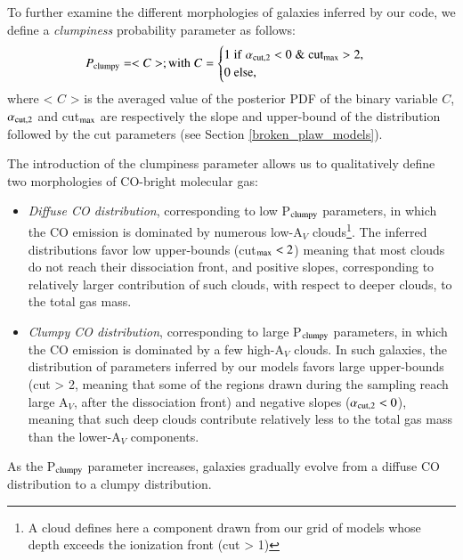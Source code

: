 \documentclass{aa}
\newcommand{\alphaCO}{\ifmmode \alpha_{\rm CO} \else $\alpha_{\rm CO}$\fi}
\begin{document}
To further examine the different morphologies of galaxies inferred by our code, we define a \textit{clumpiness} probability parameter as follows:
\begin{equation}
    \label{eq_clumpy}
    P_{\rm clumpy} = < C >;\\
    {\rm with}\; C = \begin{cases}
        1\; \rm if\; \alpha_{\rm cut,2} < 0\; \&\; \rm cut_{max} > 2,\\
        0\; \rm else,
    \end{cases}
\end{equation}
where < $C$ > is the averaged value of the posterior PDF of the binary variable $C$, $\alpha_{\rm cut,2}$ and cut$_{\rm max}$ are respectively the slope and upper-bound of the distribution followed by the cut parameters (see Section \ref{broken_plaw_models}). 

The introduction of the clumpiness parameter allows us to qualitatively define two morphologies of CO-bright molecular gas:
\begin{itemize}
    \item \textit{Diffuse CO distribution}, corresponding to low P$_{\rm clumpy}$ parameters, in which the CO emission is dominated by numerous low-A$_V$ clouds\footnote{A cloud defines here a component drawn from our grid of models whose depth exceeds the ionization front (cut > 1)}. The inferred distributions favor low upper-bounds (cut$_{\rm max} < 2$) meaning that most clouds do not reach their dissociation front, and positive slopes, corresponding to relatively larger contribution of such clouds, with respect to deeper clouds, to the total gas mass.
    \item \textit{Clumpy CO distribution}, corresponding to large P$_{\rm clumpy}$ parameters, in which the CO emission is dominated by a few high-A$_V$ clouds. In such galaxies, the distribution of parameters inferred by our models favors large upper-bounds (cut > 2, meaning that some of the regions drawn during the sampling reach large A$_V$, after the dissociation front) and negative slopes ($\alpha_{\rm cut,2} < 0$), meaning that such deep clouds contribute relatively less to the total gas mass than the lower-A$_V$ components.
\end{itemize}
As the P$_{\rm clumpy}$ parameter increases, galaxies gradually evolve from a diffuse CO distribution to a clumpy distribution.
\end{document}
